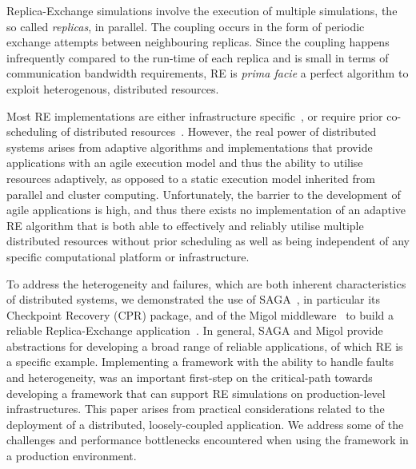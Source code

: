 \documentclass{rspublic}
\begin{document}
Replica-Exchange simulations involve the execution of multiple simulations, the so called
\emph{replicas}, in parallel. The coupling occurs in the form of periodic exchange 
attempts between neighbouring replicas. Since the coupling
happens infrequently compared to the run-time of each replica
and is small in terms of communication bandwidth requirements,
RE is {\it prima facie} a perfect algorithm to exploit heterogenous,
distributed resources.


Most RE implementations are either infrastructure 
specific~\citep{Woods:2005nx}, or require prior co-scheduling of 
distributed resources~\citep{1383459}. 
However, the real power of distributed systems arises from 
adaptive algorithms and implementations that provide
applications with an agile execution model and thus the ability to
utilise resources adaptively, as opposed to a static execution model
inherited from parallel and cluster computing. 
Unfortunately, the barrier to the development of agile applications 
is high, and thus there exists no implementation of an 
adaptive RE algorithm that is both able to effectively 
and reliably utilise multiple distributed resources without prior scheduling as
well as being independent of any specific computational platform or
infrastructure.  
                      
To address the heterogeneity and failures, which are both inherent
characteristics of distributed systems, we demonstrated the use of 
SAGA~\citep{saga_gfd90}, in particular its Checkpoint Recovery (CPR) 
package, and of the Migol middleware~\citep{schnorLuckow08} to build 
a reliable Replica-Exchange application~\citep{Luckow:2008la}. 
In general, SAGA and Migol provide abstractions for developing a
broad range of reliable applications, of which RE is a specific example. 
Implementing a framework with the ability to handle
faults and heterogeneity, was an important first-step on the
critical-path towards developing a framework that can support RE
simulations on production-level infrastructures. This paper arises from
practical considerations related to the deployment of a distributed,
loosely-coupled application.  We address some of the challenges and
performance bottlenecks encountered when using the framework 
in a production environment. 
\end{document}

